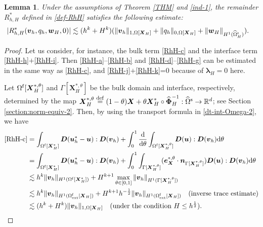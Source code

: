\documentclass[11pt,reqno]{amsart}
\theoremstyle{definition}
\theoremstyle{plain}
\newtheorem{lemma}{Lemma}[section]
\numberwithin{theorem}{section}
\numberwithin{proposition}{section}
\numberwithin{lemma}{section}
\numberwithin{equation}{section}
\newcommand{\bs}[1]{\boldsymbol{#1}}
\newcommand{\uu}[1]  {{\bs{#1}} }
\def\d{\mathrm{d}}
\newcommand{\bv}{{\bs v}}
\newcommand{\bu}{\uu{u}}
\renewcommand{\(}{\bigl(}
\renewcommand{\)}{\bigr)}
\def\eqd{\stackrel{\mathrm{def}}{=}}
\begin{document}
\begin{lemma}\label{Lemma:RhH}
Under the assumptions of Theorem \ref{THM} and \eqref{ind-1}, the remainder $R_{h,H}^*$ defined in \eqref{def-RhH} satisfies the following estimate{\rm:} 
\begin{align}\label{aux1129}
| R_{h,H}^*({\bs v}_h, q_h , {\bs w}_H, 0) | 
&\lesssim (h^k+H^k) (\|{\bs v}_h\|_{1,\Omega[{\bs X}_H]} + \|q_h\|_{0,\Omega[{\bs X}_H]} 
+ \|{\bs w}_H\|_{H^1(\widehat{\Omega}_H^{\rm s})} ) .
\end{align}
\end{lemma}
\begin{proof}
Let us consider, for instance, the bulk term \eqref{RhH-c} and the interface term \eqref{RhH-h}$+$\eqref{RhH-i}. Then \eqref{RhH-a}--\eqref{RhH-b} and \eqref{RhH-d}--\eqref{RhH-g} can be estimated in the same way as \eqref{RhH-c}, and \eqref{RhH-j}$+$\eqref{RhH-k}=0 because of ${\bs\lambda}_H=0$ here. 

Let $\Omega^{\rm f}[{\bs X}_H^{*,\theta}]$ and $\Gamma[{\bs X}_H^{*,\theta}]$ be the bulk domain and interface, respectively, determined by the map ${\bs X}_H^{*,\theta} \eqd (1-\theta){\bs X} + \theta {\bs X}_H^* \circ \widehat{\bs\Phi}_H^{-1} : \widehat\Omega^{\rm s} \rightarrow \mathbb{R}^d$; see Section \ref{section:norm-equiv-2}. Then, by using the transport formula in \eqref{dt-int-Omega-2}, we have 
\begin{align*}
\eqref{RhH-c}
&= \int_{\Omega^{\rm f}[\bs X_H^*]} \bs D({\bs u}_h^*-{\bs u}): \bs D(\bv_h)  +  \int_0^1\frac{\d}{\d\theta}\int_{\Omega^{\rm f}[\bs X_H^{*,\theta}]} \bs D(\bu): \bs D(\bv_h) \d\theta \notag\\
&= \int_{\Omega^{\rm f}[\bs X_H^*]} \bs D({\bs u}_h^*-{\bs u}): \bs D(\bv_h)  +  \int_0^1\int_{\Gamma[\bs X_H^{*,\theta}]} ({\bs e}_{\bs X}^{*,\theta}\cdot{\bs n}_{\Gamma[\bs X_H^{*,\theta}]}) \bs D(\bu): \bs D(\bv_h) \d\theta  \notag\\
&\lesssim h^k\|{\bs v}_h\|_{H^1(\Omega^{\rm f}[\bs X_H^*])}
+ H^{k+1} \max_{\theta\in[0,1]} \|{\bs v}_h\|_{H^1(\Gamma[\bs X_H^{*,\theta}])} \notag\\
&\lesssim h^k\|{\bs v}_h\|_{H^1(\Omega^{\rm f}_{\rm ext}[\bs X_H])} 
+ H^{k+1}h^{-\frac12}\|{\bs v}_h\|_{H^1(\Omega^{\rm f}_{\rm ext}[\bs X_H])} \quad\mbox{(inverse trace estimate)} \notag\\
&\lesssim (h^k+H^k) \|{\bs v}_h\|_{1,\Omega[\bs X_H]} 
\quad\mbox{(under the condition $H\le h^{\frac12}$)}. 
\end{align*}


\end{proof}
\end{document}
